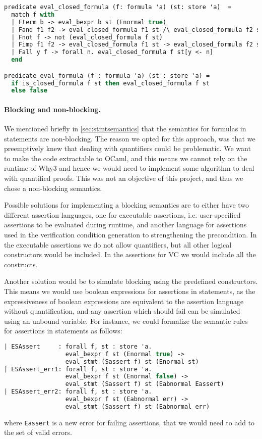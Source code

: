 \begin{lstlisting}[caption={Predicate defining the semantics of formulas},label={lst:why3formula},language=sml]
predicate eval_closed_formula (f: formula 'a) (st: store 'a)  =
  match f with
  | Fterm b -> eval_bexpr b st (Enormal true)
  | Fand f1 f2 -> eval_closed_formula f1 st /\ eval_closed_formula f2 st
  | Fnot f -> not (eval_closed_formula f st)
  | Fimp f1 f2 -> eval_closed_formula f1 st -> eval_closed_formula f2 st
  | Fall y f -> forall n. eval_closed_formula f st[y <- n]
  end

predicate eval_formula (f : formula 'a) (st : store 'a) =
  if is_closed_formula f st then eval_closed_formula f st
  else false
\end{lstlisting}

\paragraph{Blocking and non-blocking.}
We mentioned briefly in \ref{sec:stmtsemantics} that the semantics for formulas in statements
are non-blocking.
The reason we opted for this approach, was that we preemptively knew that dealing with quantifiers could be problematic.
We want to make the code extractable to OCaml, and this means we cannot rely on the runtime of Why3 and hence
we would need to implement some algorithm to deal with quantified proofs.
This was not an objective of this project, and thus we chose a non-blocking semantics.

Possible solutions for implementing a blocking semantics are to either have two different assertion languages,
one for executable assertions, i.e. user-specified assertions to be evaluated during runtime,
and another language for
assertions used in the verification condition generation to strengthening the precondition.
In the executable assertions we do not allow quantifiers, but all other logical constructors would be included.
In the assertions for VC we would include all the constructs.

Another solution would be to simulate blocking using the predefined constructors.
This means we would use boolean expressions for assertions in statements, as the expressiveness of boolean expressions are equivalent to the assertion language without quantification,
and any assertion which should fail can be simulated using an unbound variable.
For instance, we could formalize the semantic rules for assertions in statements as follows:

\begin{lstlisting}[language=sml]
| ESAssert     : forall f, st : store 'a.
                 eval_bexpr f st (Enormal true) ->
                 eval_stmt (Sassert f) st (Enormal st)
| ESAssert_err1: forall f, st : store 'a.
                 eval_bexpr f st (Enormal false) ->
                 eval_stmt (Sassert f) st (Eabnormal Eassert)
| ESAssert_err2: forall f, st : store 'a.
                 eval_bexpr f st (Eabnormal err) ->
                 eval_stmt (Sassert f) st (Eabnormal err)
\end{lstlisting}
where \texttt{Eassert} is a new error for failing assertions, that we would need to add to
the set of valid errors.

